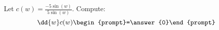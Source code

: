 \documentclass{ximera}
\author{Bart Snapp}
\begin{document}
\begin{exercise}
Let $c(w) = \frac{ -5 \sin (w)}{5 \sin (w)}$. Compute:
\[
\dd{w}c(w)
\begin{prompt}=\answer{0}\end{prompt}
\]
\end{exercise}
\end{document}
